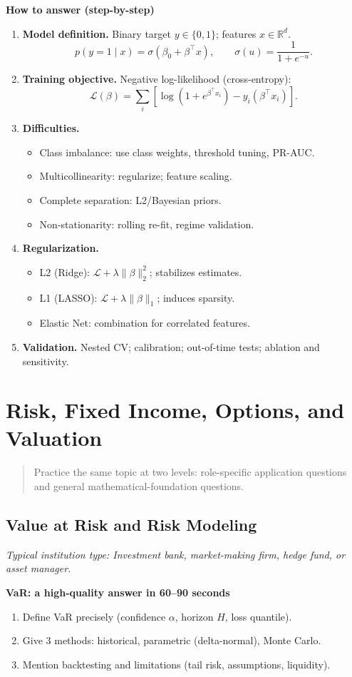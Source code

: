 \documentclass[11pt,letterpaper,openany]{book}
\newcommand{\RoleProfile}[2]{%
  \subsection{#1}%
  \noindent\textit{Typical institution type: #2.}\par
}
\newcommand{\playbooknote}[1]{\begin{quote}\small #1\end{quote}}
\begin{document}
\textbf{How to answer (step-by-step)}
\begin{enumerate}
  \item \textbf{Model definition.} Binary target $y \in \{0,1\}$; features $x \in \mathbb{R}^d$.
  \[
    p(y = 1 \mid x) = \sigma(\beta_0 + \beta^\top x),
    \qquad
    \sigma(u) = \frac{1}{1 + e^{-u}}.
  \]

  \item \textbf{Training objective.} Negative log-likelihood (cross-entropy):
  \[
    \mathcal{L}(\beta) = \sum_i \left[\log(1 + e^{\beta^\top x_i}) - y_i(\beta^\top x_i)\right].
  \]

  \item \textbf{Difficulties.}
  \begin{itemize}
    \item Class imbalance: use class weights, threshold tuning, PR-AUC.
    \item Multicollinearity: regularize; feature scaling.
    \item Complete separation: L2/Bayesian priors.
    \item Non-stationarity: rolling re-fit, regime validation.
  \end{itemize}

  \item \textbf{Regularization.}
  \begin{itemize}
    \item L2 (Ridge): $\mathcal{L} + \lambda \lVert \beta \rVert_2^2$; stabilizes estimates.
    \item L1 (LASSO): $\mathcal{L} + \lambda \lVert \beta \rVert_1$; induces sparsity.
    \item Elastic Net: combination for correlated features.
  \end{itemize}

  \item \textbf{Validation.} Nested CV; calibration; out-of-time tests; ablation and sensitivity.
\end{enumerate}

\section{Risk, Fixed Income, Options, and Valuation}
\playbooknote{Practice the same topic at two levels: role-specific application questions and general mathematical-foundation questions.}

\RoleProfile{Value at Risk and Risk Modeling}{Investment bank, market-making firm, hedge fund, or asset manager}
\textbf{VaR: a high-quality answer in 60--90 seconds}
\begin{enumerate}
  \item Define VaR precisely (confidence $\alpha$, horizon $H$, loss quantile).
  \item Give 3 methods: historical, parametric (delta-normal), Monte Carlo.
  \item Mention backtesting and limitations (tail risk, assumptions, liquidity).
\end{enumerate}
\end{document}
